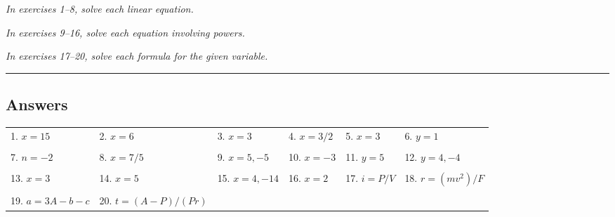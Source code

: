 \begin{exercises}
\textit{In exercises 1--8, solve each linear equation.}



\textit{In exercises 9--16, solve each equation involving powers.}



\textit{In exercises 17--20, solve each formula for the given variable.}



\vspace*{0.25in}

{\color{blue!60!black} \rule{\textwidth}{3pt}}
\vspace*{0.25in}

\subsection{Answers}
\begin{tabularx}{\textwidth}{l l l l l l}
1. $x=15$ & 2. $x=6$ & 3. $x=3$ & 4. $x = 3/2$ & 5. $x=3$ & 6. $y=1$\\ \\
7. $n=-2$ & 8. $x=7/5$ & 9. $x=5,-5$ & 10. $x=-3$ & 11. $y=5$ & 12. $y=4,-4$\\ \\
13. $x=3$ & 14. $x=5$ & 15. $x=4,-14$ & 16. $x=2$ & 17. $i = P/V$ & 18. $r = (mv^2)/F$\\ \\
19. $a=3A-b-c$ & 20. $t=(A-P)/(Pr)$
\end{tabularx}
\end{exercises}